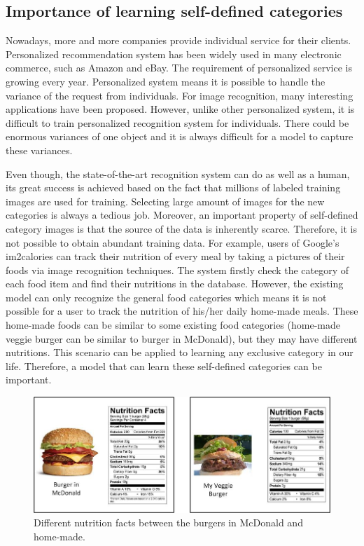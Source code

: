 \subsection{Importance of learning self-defined categories}
Nowadays, more and more companies provide individual service for their clients. Personalized recommendation system has been widely used in many electronic commerce, such as Amazon and eBay. The requirement of personalized service is growing every year. Personalized system means it is possible to handle the variance of the request from individuals. For image recognition, many interesting applications have been proposed. However, unlike other personalized system, it is difficult to train personalized recognition system for individuals. There could be enormous variances of one object and it is always difficult for a model to capture these variances.

Even though, the state-of-the-art recognition system can do as well as a human, its great success is achieved based on the fact that millions of labeled training images are used for training. Selecting large amount of images for the new categories is always a tedious job.
Moreover, an important property of self-defined category images is that the source of the data is inherently scarce. Therefore, it is not possible to obtain abundant training data. For example, users of Google's im2calories can track their nutrition of every meal by taking a pictures of their foods via image recognition techniques. The system firstly check the category of each food item and find their nutritions in the database. However, the existing model can only recognize the general food categories which means it is not possible for a user to track the nutrition of his/her daily home-made meals. These home-made foods can be similar to some existing food categories (home-made veggie burger can be similar to burger in McDonald), but they may have different nutritions. This scenario can be applied to learning any exclusive category in our life. Therefore, a model that can learn these self-defined categories can be important.

\begin{figure}
	\centering
	\includegraphics[scale=.6]{introduction/fig/scenario.jpg}
	\caption{Different nutrition facts between the burgers in McDonald and home-made.}\label{fig:intro:scenario}
\end{figure}

